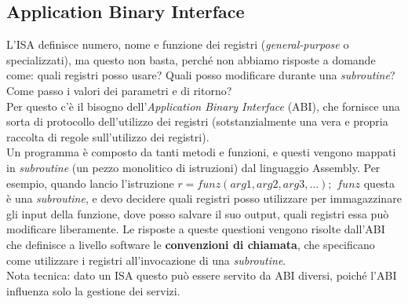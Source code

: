 \documentclass[class=book, crop=false]{standalone}
\begin{document}
\subsection{Application Binary Interface}
L'ISA definisce numero, nome e funzione dei registri (\emph{general-purpose} o  specializzati), ma questo non basta, perché non abbiamo risposte a domande come: quali registri posso usare? Quali posso modificare durante una \emph{subroutine}? Come passo i valori dei parametri e di ritorno?\\
Per questo c’è il bisogno dell'\emph{Application Binary Interface} (ABI), che fornisce una sorta di protocollo dell’utilizzo dei registri (sotstanzialmente una vera e propria raccolta di regole sull’utilizzo dei registri).\\
Un programma è composto da tanti metodi e funzioni, e questi vengono mappati in \emph{subroutine} (un pezzo monolitico di istruzioni) dal linguaggio Assembly.
Per esempio, quando lancio l’istruzione $r=funz(arg1, arg2, arg3, …);$ $funz$ questa è una \emph{subroutine}, e devo decidere quali registri posso utilizzare per immagazzinare gli input della funzione, dove posso salvare il suo output, quali registri essa può modificare liberamente. Le risposte a queste questioni vengono risolte dall’ABI che definisce a livello software le \textbf{convenzioni di chiamata}, che specificano come utilizzare i registri all’invocazione di una \emph{subroutine}.\\
Nota tecnica: dato un ISA questo può essere servito da ABI diversi, poiché l’ABI influenza solo la gestione dei servizi.
\end{document}
